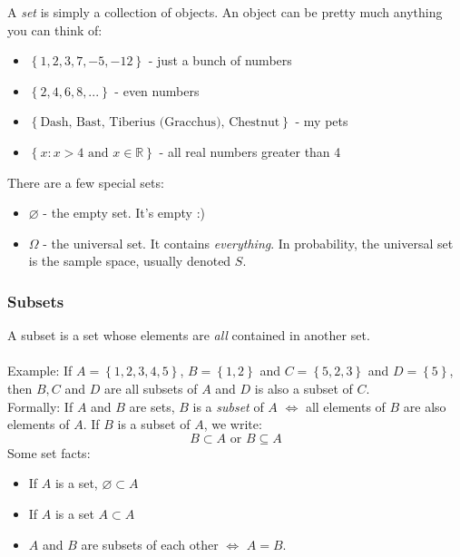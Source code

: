 \documentclass[12pt]{article} %
\begin{document}
A \emph{set} is simply a collection of objects. An object can be pretty much anything you can think of:

\begin{itemize}
\item $\left\{1,2,3,7,-5,-12\right\}$ - just a bunch of numbers
\item $\left\{2,4,6,8,...\right\}$ - even numbers
\item $\left\{\textrm{Dash, Bast, Tiberius (Gracchus), Chestnut}\right\}$ - my pets
\item $\left\{x:x>4\textrm{ and } x\in\mathbb{R}\right\}$ - all real numbers greater than 4
\end{itemize}

There are a few special sets:

\begin{itemize}
\item $\varnothing$ - the empty set. It's empty :)
\item $\Omega$ - the universal set. It contains \emph{everything}. In probability, the universal set is the sample space, usually denoted $S$.
\end{itemize}
\subsubsection{Subsets}
A subset is a set whose elements are \emph{all} contained in another set.\\\\
Example: If $A=\left\{1,2,3,4,5\right\}$, $B=\left\{1,2\right\}$ and $C=\left\{5,2,3\right\}$ and $D=\left\{5\right\}$, then $B,C$ and $D$ are all subsets of $A$ and $D$ is also a subset of $C$.\\

Formally: If $A$ and $B$ are sets, $B$ is a \emph{subset} of $A$ $\iff$ all elements of $B$ are also elements of $A$. If $B$ is a subset of $A$, we write:
$$B\subset A \textrm{ or } B\subseteq A$$ 
Some set facts:
\begin{itemize}
\item If $A$ is a set, $\varnothing\subset A$
\item If $A$ is a set $A\subset A$
\item $A$ and $B$ are subsets of each other $\iff$ $A = B$.\\
\end{itemize}
\end{document}

